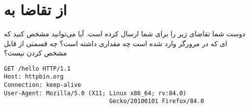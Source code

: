 \documentclass[../main.tex]{subfiles}
\begin{document}
\section{از تقاضا به }

\paragraph{}
دوست شما تقاضای  زیر را برای شما ارسال کرده است.
آیا می‌توانید مشخص کنید که ای که در مرورگر وارد شده است چه مقداری داشته است؟
چه قسمتی از  قابل مشخص کردن نیست؟

\begin{latin}
\begin{verbatim}
GET /hello HTTP/1.1
Host: httpbin.org
Connection: keep-alive
User-Agent: Mozilla/5.0 (X11; Linux x86_64; rv:84.0)
                              Gecko/20100101 Firefox/84.0
\end{verbatim}
\end{latin}
\end{document}
